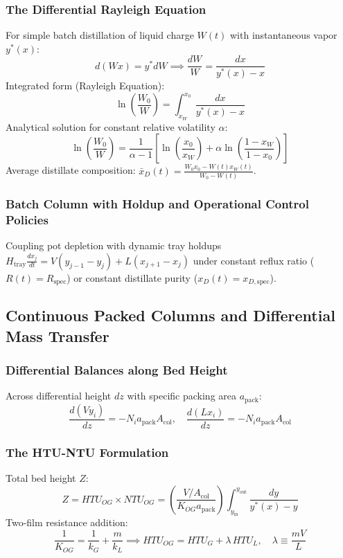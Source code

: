 \documentclass[11pt,a4paper]{article}
\begin{document}
\subsubsection{The Differential Rayleigh Equation}
For simple batch distillation of liquid charge $W(t)$ with instantaneous vapor $y^*(x)$:
\begin{equation}
d(W x) = y^* dW \implies \frac{dW}{W} = \frac{dx}{y^*(x) - x}
\end{equation}
Integrated form (Rayleigh Equation):
\begin{equation}
\ln\left( \frac{W_0}{W} \right) = \int_{x_W}^{x_0} \frac{dx}{y^*(x) - x}
\end{equation}
Analytical solution for constant relative volatility $\alpha$:
\begin{equation}
\ln\left( \frac{W_0}{W} \right) = \frac{1}{\alpha - 1} \left[ \ln\left( \frac{x_0}{x_W} \right) + \alpha \ln\left( \frac{1 - x_W}{1 - x_0} \right) \right]
\end{equation}
Average distillate composition: $\bar{x}_D(t) = \frac{W_0 x_0 - W(t) x_W(t)}{W_0 - W(t)}$.

\subsubsection{Batch Column with Holdup and Operational Control Policies}
Coupling pot depletion with dynamic tray holdups $H_{\text{tray}} \frac{dx_j}{dt} = V(y_{j-1} - y_j) + L(x_{j+1} - x_j)$ under constant reflux ratio ($R(t) = R_{\text{spec}}$) or constant distillate purity ($x_D(t) = x_{D,\text{spec}}$).

\subsection{Continuous Packed Columns and Differential Mass Transfer}

\subsubsection{Differential Balances along Bed Height}
Across differential height $dz$ with specific packing area $a_{\text{pack}}$:
\begin{equation}
\frac{d(V y_i)}{dz} = -N_i a_{\text{pack}} A_{\text{col}}, \quad \frac{d(L x_i)}{dz} = -N_i a_{\text{pack}} A_{\text{col}}
\end{equation}

\subsubsection{The HTU-NTU Formulation}
Total bed height $Z$:
\begin{equation}
Z = HTU_{OG} \times NTU_{OG} = \left( \frac{V / A_{\text{col}}}{K_{OG} a_{\text{pack}}} \right) \int_{y_{\text{in}}}^{y_{\text{out}}} \frac{dy}{y^*(x) - y}
\end{equation}
Two-film resistance addition:
\begin{equation}
\frac{1}{K_{OG}} = \frac{1}{k_G} + \frac{m}{k_L} \implies HTU_{OG} = HTU_G + \lambda \, HTU_L, \quad \lambda \equiv \frac{m V}{L}
\end{equation}
\end{document}
